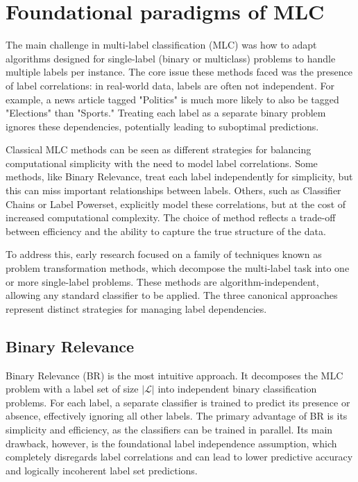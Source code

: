 \chapter{Foundational paradigms of MLC}
The main challenge in multi-label classification (MLC) was how to adapt algorithms designed for single-label (binary or multiclass) problems to handle multiple labels per instance. The core issue these methods faced was the presence of label correlations: in real-world data, labels are often not independent. For example, a news article tagged "Politics" is much more likely to also be tagged "Elections" than "Sports." Treating each label as a separate binary problem ignores these dependencies, potentially leading to suboptimal predictions.

Classical MLC methods can be seen as different strategies for balancing computational simplicity with the need to model label correlations. Some methods, like Binary Relevance, treat each label independently for simplicity, but this can miss important relationships between labels. Others, such as Classifier Chains or Label Powerset, explicitly model these correlations, but at the cost of increased computational complexity. The choice of method reflects a trade-off between efficiency and the ability to capture the true structure of the data.

To address this, early research focused on a family of techniques known as problem transformation methods, which decompose the multi-label task into one or more single-label problems. These methods are algorithm-independent, allowing any standard classifier to be applied. The three canonical approaches represent distinct strategies for managing label dependencies.

\section{Binary Relevance}
Binary Relevance (BR) is the most intuitive approach. It decomposes the MLC problem with a label set of size $|\mathcal{L}|$ into independent binary classification problems. For each label, a separate classifier is trained to predict its presence or absence, effectively ignoring all other labels. \cite{zhang_binary_2018} The primary advantage of BR is its simplicity and efficiency, as the classifiers can be trained in parallel. Its main drawback, however, is the foundational label independence assumption, which completely disregards label correlations and can lead to lower predictive accuracy and logically incoherent label set predictions. \cite{Sucar2014Multi-label}

